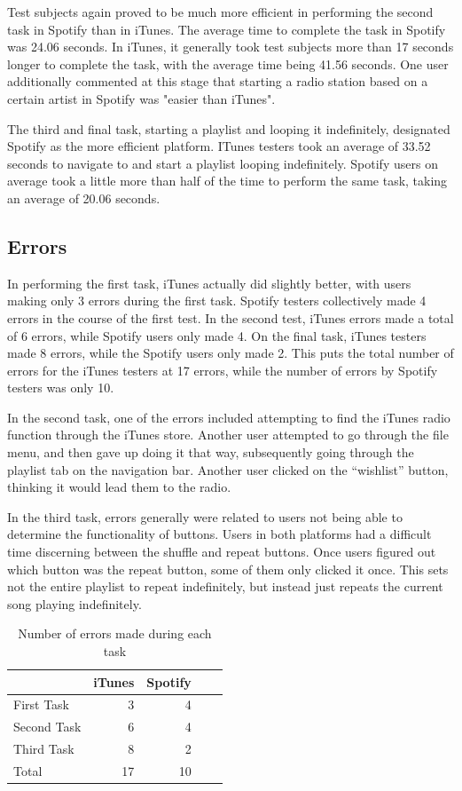 \documentclass[12pt]{article}
\begin{document}
Test subjects again proved to be much more efficient in performing 
the second task in Spotify than in iTunes. The average time to 
complete the task in Spotify was 24.06 seconds. In iTunes, it 
generally took test subjects more than 17 seconds longer to 
complete the task, with the average time being 41.56 seconds. One 
user additionally commented at this stage that starting a radio 
station based on a certain artist in Spotify was "easier than 
iTunes".

The third and final task, starting a playlist and looping it 
indefinitely, designated Spotify as the more efficient platform. 
ITunes testers took an average of 33.52 seconds to navigate to and 
start a playlist looping indefinitely. Spotify users on average 
took a little more than half of the time to perform the same task, 
taking an average of 20.06 seconds.

\subsection{Errors}

In performing the first task, iTunes actually did slightly better, with users making only 3 
errors during the first task. Spotify testers collectively made 4 
errors in the course of the first test. In the second test, iTunes 
errors made a total of 6 errors, while Spotify users only made 4. 
On the final task, iTunes testers made 8 errors, while the Spotify 
users only made 2. This puts the total number of errors for the 
iTunes testers at 17 errors, while the number of errors by Spotify 
testers was only 10.

In the second task, one of the errors included attempting to find 
the iTunes radio function through the iTunes store. Another user 
attempted to go through the file menu, and then gave up doing it 
that way, subsequently going through the playlist tab on the 
navigation bar. Another user clicked on the ``wishlist'' button, 
thinking it would lead them to the radio.

In the third task, errors generally were related to users not 
being able to determine the functionality of buttons. Users in 
both platforms had a difficult time discerning between the shuffle 
and repeat buttons. Once users figured out which button was the 
repeat button, some of them only clicked it once. This sets not 
the entire playlist to repeat indefinitely, but instead just 
repeats the current song playing indefinitely.

\begin{table}[h]
\centering
\begin{tabular}{lrrll}
\hline
            & iTunes & Spotify &  &  \\ \hline
First Task  & 3      & 4       &  &  \\
Second Task & 6      & 4       &  &  \\
Third Task  & 8      & 2       &  &  \\ \hline
Total       & 17     & 10      &  & 
\end{tabular}
\caption{Number of errors made during each task}
\end{table}
\end{document}
